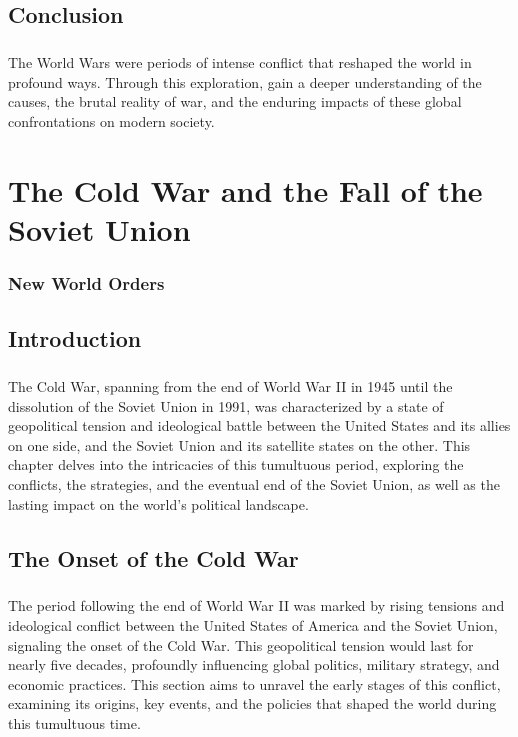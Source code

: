 \documentclass[a4paper,12pt]{book}
\begin{document}
\section*{Conclusion}
\paragraph{}
The World Wars were periods of intense conflict that reshaped the world in profound ways. Through this exploration, gain a deeper understanding of the causes, the brutal reality of war, and the enduring impacts of these global confrontations on modern society.

\chapter{The Cold War and the Fall of the Soviet Union}
\subsection*{New World Orders}

\section*{Introduction}
\paragraph{}
The Cold War, spanning from the end of World War II in 1945 until the dissolution of the Soviet Union in 1991, was characterized by a state of geopolitical tension and ideological battle between the United States and its allies on one side, and the Soviet Union and its satellite states on the other. This chapter delves into the intricacies of this tumultuous period, exploring the conflicts, the strategies, and the eventual end of the Soviet Union, as well as the lasting impact on the world’s political landscape.

\section*{The Onset of the Cold War}
\paragraph{}
The period following the end of World War II was marked by rising tensions and ideological conflict between the United States of America and the Soviet Union, signaling the onset of the Cold War. This geopolitical tension would last for nearly five decades, profoundly influencing global politics, military strategy, and economic practices. This section aims to unravel the early stages of this conflict, examining its origins, key events, and the policies that shaped the world during this tumultuous time.
\end{document}

